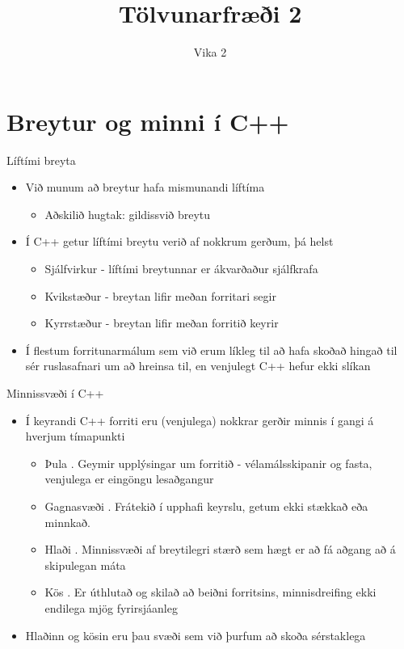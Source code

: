 \documentclass{beamer}
\title{Tölvunarfræði 2}
\subtitle{Vika 2}
\begin{document}
\begin{frame}
\titlepage
\end{frame}

\section{Breytur og minni í C++}

\begin{frame}{Líftími breyta}
    \begin{itemize}
        \item Við munum að breytur hafa mismunandi líftíma
        \begin{itemize}
            \item Aðskilið hugtak: gildissvið breytu 
        \end{itemize}
        \item Í C++ getur líftími breytu verið af nokkrum gerðum, þá helst
        \begin{itemize}
            \item Sjálfvirkur  - líftími breytunnar er ákvarðaður sjálfkrafa
            \item Kvikstæður  - breytan lifir meðan forritari segir
            \item Kyrrstæður  - breytan lifir meðan forritið keyrir
        \end{itemize}
        \item Í flestum forritunarmálum sem við erum líkleg til að hafa skoðað hingað til sér ruslasafnari  um að hreinsa til, en venjulegt C++ hefur ekki slíkan
    \end{itemize}
\end{frame}

\begin{frame}{Minnissvæði í C++}
    \begin{itemize}
        \item Í keyrandi C++ forriti eru (venjulega) nokkrar gerðir minnis í gangi á hverjum tímapunkti
        \begin{itemize}
            \item Þula . Geymir upplýsingar um forritið - vélamálsskipanir og fasta, venjulega er eingöngu lesaðgangur
            \item Gagnasvæði .
            Frátekið í upphafi keyrslu, getum ekki stækkað eða minnkað.
            \item Hlaði . Minnissvæði af breytilegri stærð sem hægt er að fá aðgang að á skipulegan máta
            \item Kös . Er úthlutað og skilað að beiðni forritsins, minnisdreifing ekki endilega mjög fyrirsjáanleg
        \end{itemize}
        \item Hlaðinn og kösin eru þau svæði sem við þurfum að skoða sérstaklega
    \end{itemize}
\end{frame}
\end{document}
